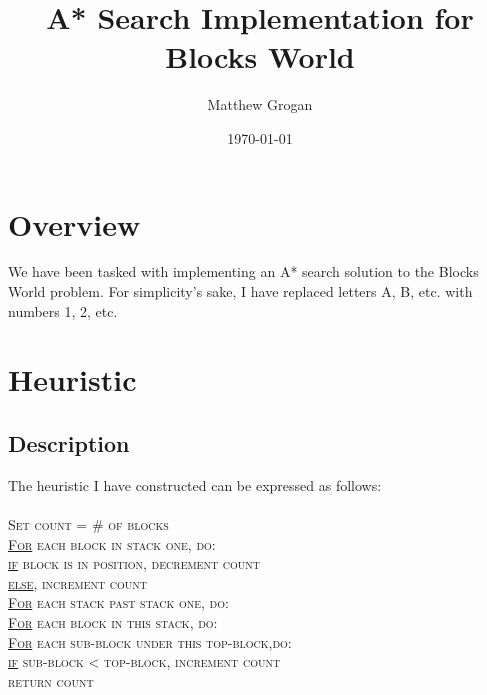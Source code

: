 \documentclass{article}
\title{A* Search Implementation for Blocks World} %
\author{Matthew Grogan} %
\date{\today} %
\begin{document}
\maketitle %



\section{Overview}

We have been tasked with implementing an A* search solution to the Blocks World
problem. For simplicity's sake, I have replaced letters A, B, etc. with numbers
1, 2, etc. 


\section{Heuristic}
\subsection{Description}
The heuristic I have constructed can be expressed as follows:\\\\
\hspace*{1cm}\textsc{Set count = \# of blocks}\\
\hspace*{1cm}\textsc{\underline{For} each block in stack one, do:}\\
\hspace*{2cm}\textsc{\underline{if} block is in position, decrement count}\\
\hspace*{2cm}\textsc{\underline{else}, increment count}\\
\hspace*{1cm}\textsc{\underline{For} each stack past stack one, do:}\\
\hspace*{2cm}\textsc{\underline{For} each block in this stack, do:}\\
\hspace*{3cm}\textsc{\underline{For} each sub-block under this top-block,do:}\\
\hspace*{4cm}\textsc{\underline{if} sub-block < top-block, increment count}\\
\hspace*{1cm}\textsc{return count}\\\\
\end{document}
